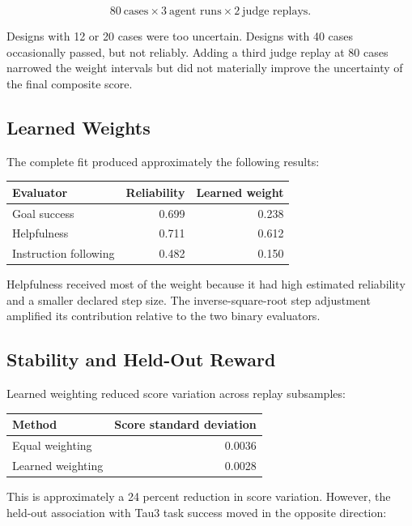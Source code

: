 \documentclass[11pt]{article}
\begin{document}
\begin{center}
\[
80\ \text{cases}
\times 3\ \text{agent runs}
\times 2\ \text{judge replays}.
\]
\end{center}

Designs with 12 or 20 cases were too uncertain. Designs with 40 cases
occasionally passed, but not reliably. Adding a third judge replay at 80 cases
narrowed the weight intervals but did not materially improve the uncertainty
of the final composite score.

\subsection{Learned Weights}

The complete fit produced approximately the following results:

\begin{center}
\begin{tabular}{lrr}
\toprule
Evaluator & Reliability & Learned weight \\
\midrule
Goal success & 0.699 & 0.238 \\
Helpfulness & 0.711 & 0.612 \\
Instruction following & 0.482 & 0.150 \\
\bottomrule
\end{tabular}
\end{center}

Helpfulness received most of the weight because it had high estimated
reliability and a smaller declared step size. The inverse-square-root step
adjustment amplified its contribution relative to the two binary evaluators.

\subsection{Stability and Held-Out Reward}

Learned weighting reduced score variation across replay subsamples:

\begin{center}
\begin{tabular}{lr}
\toprule
Method & Score standard deviation \\
\midrule
Equal weighting & 0.0036 \\
Learned weighting & 0.0028 \\
\bottomrule
\end{tabular}
\end{center}

This is approximately a 24 percent reduction in score variation. However, the
held-out association with Tau3 task success moved in the opposite direction:
\end{document}
